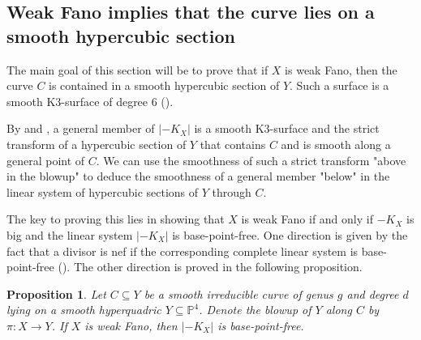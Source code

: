 \documentclass[english,11pt,reqno]{amsart}
\newcommand{\sub}{\subseteq}
\newcommand{\Pfour}{\mathbb{P}^4}
\newtheorem{prop}[thm]{Proposition}
\begin{document}
\subsection{Weak Fano implies that the curve lies on a smooth hypercubic section} \label{subsection:anticanonical_system_base_point_free}
%
The main goal of this section will be to prove that if $X$ is weak Fano, then the curve $C$ is contained in a smooth hypercubic section of $Y$. Such a surface is a smooth K3-surface of degree 6 ().\par
By  and , a general member of $|-K_X|$ is a smooth K3-surface and  the strict transform of a hypercubic section of $Y$ that contains $C$ and is smooth along a general point of $C$. We can use the smoothness of such a strict transform "above in the blowup" to deduce the smoothness of a general member "below" in the linear system of hypercubic sections of $Y$ through $C$. \par 
The key to proving this lies in showing that $X$ is weak Fano if and only if $-K_X$ is big and the linear system $|-K_X|$ is base-point-free. One direction is given by the fact that a divisor is nef if the corresponding complete linear system is base-point-free (). The other direction is proved in the following proposition. 
%
%
\begin{prop} \label{prop:weak_Fano_implies_base_point_free}
Let $C \sub Y$ be a smooth irreducible curve of genus $g$ and degree $d$ lying on a smooth hyperquadric $Y\sub \Pfour$. Denote the blowup of $Y$ along $C$ by $\pi:X\rightarrow Y$. If $X$ is weak Fano, then $|-K_X|$ is base-point-free.
\end{prop}
%
\end{document}
